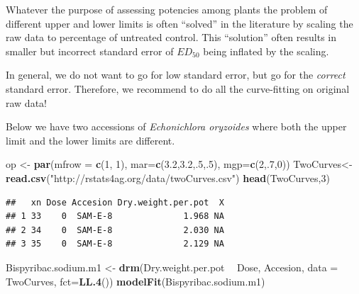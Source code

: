 \documentclass[letterpaper,]{book}
\newenvironment{Shaded}{\begin{snugshade}}{\end{snugshade}}
\newcommand{\DataTypeTok}[1]{\textcolor[rgb]{0.13,0.29,0.53}{#1}}
\newcommand{\DecValTok}[1]{\textcolor[rgb]{0.00,0.00,0.81}{#1}}
\newcommand{\FloatTok}[1]{\textcolor[rgb]{0.00,0.00,0.81}{#1}}
\newcommand{\KeywordTok}[1]{\textcolor[rgb]{0.13,0.29,0.53}{\textbf{#1}}}
\newcommand{\NormalTok}[1]{#1}
\newcommand{\OperatorTok}[1]{\textcolor[rgb]{0.81,0.36,0.00}{\textbf{#1}}}
\newcommand{\StringTok}[1]{\textcolor[rgb]{0.31,0.60,0.02}{#1}}
\begin{document}
Whatever the purpose of assessing potencies among plants the problem of different upper and lower limits is often ``solved'' in the literature by scaling the raw data to percentage of untreated control. This ``solution'' often results in smaller but incorrect standard error of \(ED_{50}\) being inflated by the scaling.

In general, we do not want to go for low standard error, but go for the \emph{correct} standard error. Therefore, we recommend to do all the curve-fitting on original raw data!

Below we have two accessions of \emph{Echonichlora oryzoides} where both the upper limit and the lower limits are different.



\begin{Shaded}
\begin{Highlighting}[]
\NormalTok{op <-}\StringTok{ }\KeywordTok{par}\NormalTok{(}\DataTypeTok{mfrow =} \KeywordTok{c}\NormalTok{(}\DecValTok{1}\NormalTok{, }\DecValTok{1}\NormalTok{), }\DataTypeTok{mar=}\KeywordTok{c}\NormalTok{(}\FloatTok{3.2}\NormalTok{,}\FloatTok{3.2}\NormalTok{,.}\DecValTok{5}\NormalTok{,.}\DecValTok{5}\NormalTok{), }\DataTypeTok{mgp=}\KeywordTok{c}\NormalTok{(}\DecValTok{2}\NormalTok{,.}\DecValTok{7}\NormalTok{,}\DecValTok{0}\NormalTok{))}
\NormalTok{TwoCurves<-}\KeywordTok{read.csv}\NormalTok{(}\StringTok{"http://rstats4ag.org/data/twoCurves.csv"}\NormalTok{)}
\KeywordTok{head}\NormalTok{(TwoCurves,}\DecValTok{3}\NormalTok{)}
\end{Highlighting}
\end{Shaded}

\begin{verbatim}
##   xn Dose Accesion Dry.weight.per.pot  X
## 1 33    0  SAM-E-8              1.968 NA
## 2 34    0  SAM-E-8              2.030 NA
## 3 35    0  SAM-E-8              2.129 NA
\end{verbatim}

\begin{Shaded}
\begin{Highlighting}[]
\NormalTok{Bispyribac.sodium.m1 <-}\StringTok{ }\KeywordTok{drm}\NormalTok{(Dry.weight.per.pot }\OperatorTok{~}\StringTok{ }\NormalTok{Dose, Accesion,}
                            \DataTypeTok{data =}\NormalTok{ TwoCurves, }\DataTypeTok{fct=}\KeywordTok{LL.4}\NormalTok{())}
\KeywordTok{modelFit}\NormalTok{(Bispyribac.sodium.m1)}
\end{Highlighting}
\end{Shaded}
\end{document}
